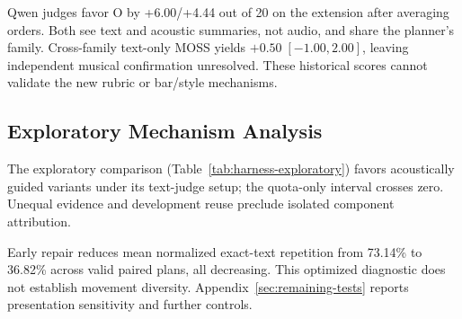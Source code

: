 Qwen judges favor O by +6.00/+4.44 out of 20 on the extension after
averaging orders. Both see text and acoustic summaries, not audio,
and share the planner's family. Cross-family text-only MOSS yields
$+0.50\;[-1.00,2.00]$, leaving independent musical confirmation
unresolved. These historical scores cannot validate the new rubric
or bar/style mechanisms.

\subsection{Exploratory Mechanism Analysis}
\label{sec:exp-mechanisms}
The exploratory comparison (Table~\ref{tab:harness-exploratory})
favors acoustically guided variants under its text-judge setup;
the quota-only interval crosses zero. Unequal evidence and development
reuse preclude isolated component attribution.

Early repair reduces mean normalized exact-text repetition from 73.14\%
to 36.82\% across valid paired plans, all decreasing.
This optimized diagnostic does not establish movement diversity.
Appendix~\ref{sec:remaining-tests} reports presentation sensitivity and
further controls.
